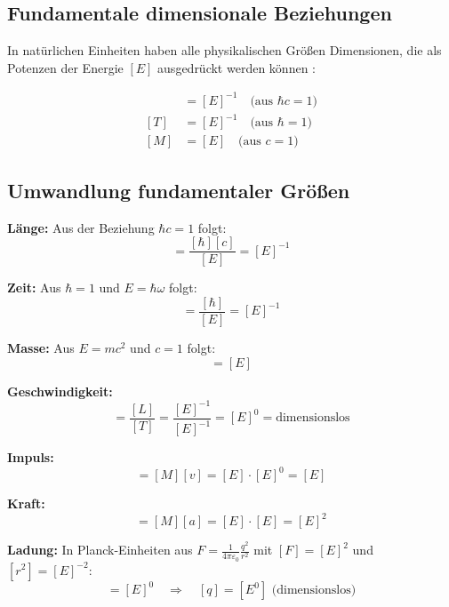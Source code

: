 	\subsection{Fundamentale dimensionale Beziehungen}
	
	In natürlichen Einheiten haben alle physikalischen Größen Dimensionen, die als Potenzen der Energie $[E]$ ausgedrückt werden können \cite{weinberg1995,peskin1995}:
	
	\begin{align}
		[L] &= [E]^{-1} \quad \text{(aus } \hbar c = 1\text{)} \\
		[T] &= [E]^{-1} \quad \text{(aus } \hbar = 1\text{)} \\
		[M] &= [E] \quad \text{(aus } c = 1\text{)}
	\end{align}
	
	\subsection{Umwandlung fundamentaler Größen}
	
	\textbf{Länge:} Aus der Beziehung $\hbar c = 1$ folgt:
	\begin{equation}
		[L] = \frac{[\hbar][c]}{[E]} = [E]^{-1}
	\end{equation}
	
	\textbf{Zeit:} Aus $\hbar = 1$ und $E = \hbar \omega$ folgt:
	\begin{equation}
		[T] = \frac{[\hbar]}{[E]} = [E]^{-1}
	\end{equation}
	
	\textbf{Masse:} Aus $E = mc^2$ und $c = 1$ folgt:
	\begin{equation}
		[M] = [E]
	\end{equation}
	
	\textbf{Geschwindigkeit:} 
	\begin{equation}
		[v] = \frac{[L]}{[T]} = \frac{[E]^{-1}}{[E]^{-1}} = [E]^0 = \text{dimensionslos}
	\end{equation}
	
	\textbf{Impuls:}
	\begin{equation}
		[p] = [M][v] = [E] \cdot [E]^0 = [E]
	\end{equation}
	
	\textbf{Kraft:}
	\begin{equation}
		[F] = [M][a] = [E] \cdot [E] = [E]^2
	\end{equation}
	
	\textbf{Ladung:} In Planck-Einheiten aus $F = \frac{1}{4\pi\varepsilon_0} \frac{q^2}{r^2}$ mit $[F] = [E]^2$ und $[r^2] = [E]^{-2}$:
	\begin{equation}
		[q^2] = [E]^0 \quad \Rightarrow \quad [q] = [E^0] \text{ (dimensionslos)}
	\end{equation}
	
